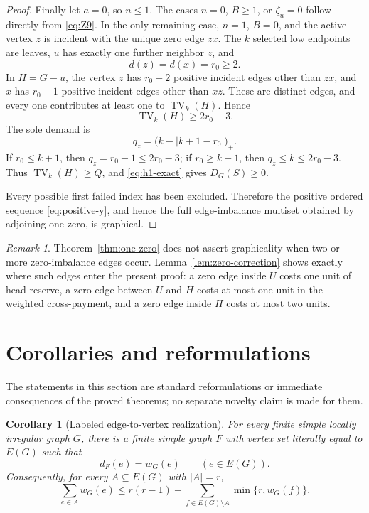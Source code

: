 \documentclass[a4paper,11pt]{amsart}
\numberwithin{equation}{section}
\newtheorem{corollary}[theorem]{Corollary}
\theoremstyle{definition}
\theoremstyle{remark}
\newtheorem{remark}[theorem]{Remark}
\newcommand{\TV}{\operatorname{TV}}
\begin{document}
\begin{proof}
Finally let $a=0$, so $n\le1$.  The cases $n=0$, $B\ge1$, or $\zeta_u=0$ follow directly from \eqref{eq:Z9}.  In the only remaining case, $n=1$, $B=0$, and the active vertex $z$ is incident with the unique zero edge $zx$.  The $k$ selected low endpoints are leaves, $u$ has exactly one further neighbor $z$, and
\begin{equation}
d(z)=d(x)=r_0\ge2.
\label{eq:r0}
\end{equation}
In $H=G-u$, the vertex $z$ has $r_0-2$ positive incident edges other than $zx$, and $x$ has $r_0-1$ positive incident edges other than $xz$.  These are distinct edges, and every one contributes at least one to $\TV_k(H)$.  Hence
\begin{equation}
\TV_k(H)\ge2r_0-3.
\label{eq:TV-r0}
\end{equation}
The sole demand is
\begin{equation}
q_z=\bigl(k-\lvert k+1-r_0\rvert\bigr)_+.
\label{eq:q-r0}
\end{equation}
If $r_0\le k+1$, then $q_z=r_0-1\le2r_0-3$; if $r_0\ge k+1$, then $q_z\le k\le2r_0-3$.  Thus $\TV_k(H)\ge Q$, and \eqref{eq:h1-exact} gives $D_G(S)\ge0$.

Every possible first failed index has been excluded.  Therefore the positive ordered sequence \eqref{eq:positive-y}, and hence the full edge-imbalance multiset obtained by adjoining one zero, is graphical.
\end{proof}

\begin{remark}
Theorem~\ref{thm:one-zero} does not assert graphicality when two or more zero-imbalance edges occur.  Lemma~\ref{lem:zero-correction} shows exactly where such edges enter the present proof: a zero edge inside $U$ costs one unit of head reserve, a zero edge between $U$ and $H$ costs at most one unit in the weighted cross-payment, and a zero edge inside $H$ costs at most two units.
\end{remark}

\section{Corollaries and reformulations}\label{sec:corollaries}

The statements in this section are standard reformulations or immediate consequences of the proved theorems; no separate novelty claim is made for them.

\begin{corollary}[Labeled edge-to-vertex realization]\label{cor:labeled}
For every finite simple locally irregular graph $G$, there is a finite simple graph $F$ with vertex set literally equal to $E(G)$ such that
\begin{equation}
d_F(e)=w_G(e)\qquad(e\in E(G)).
\label{eq:labeled-realization}
\end{equation}
Consequently, for every $A\subseteq E(G)$ with $\lvert A\rvert=r$,
\begin{equation}
\sum_{e\in A}w_G(e)
\le r(r-1)+\sum_{f\in E(G)\setminus A}\min\{r,w_G(f)\}.
\label{eq:all-subsets}
\end{equation}
\end{corollary}
\end{document}
